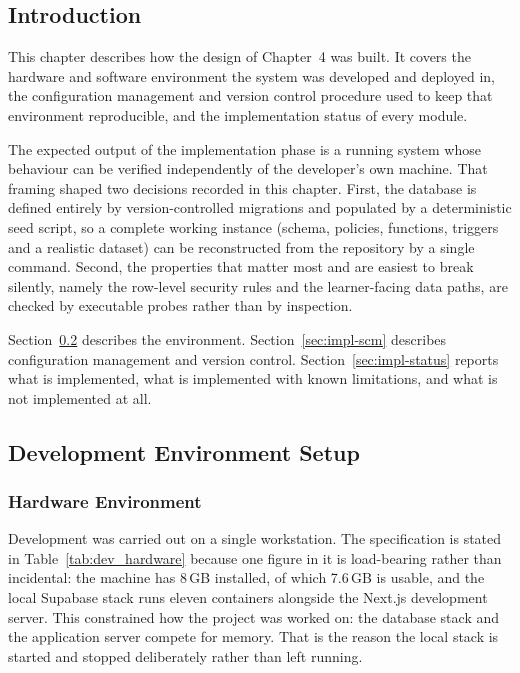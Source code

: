 \documentclass[12pt, oneside]{article} %
\begin{document}
\subsection{Introduction}

This chapter describes how the design of Chapter~4 was built. It covers the hardware and software environment the system was developed and deployed in, the configuration management and version control procedure used to keep that environment reproducible, and the implementation status of every module.

The expected output of the implementation phase is a running system whose behaviour can be verified independently of the developer's own machine. That framing shaped two decisions recorded in this chapter. First, the database is defined entirely by version-controlled migrations and populated by a deterministic seed script, so a complete working instance (schema, policies, functions, triggers and a realistic dataset) can be reconstructed from the repository by a single command. Second, the properties that matter most and are easiest to break silently, namely the row-level security rules and the learner-facing data paths, are checked by executable probes rather than by inspection.

Section~\ref{sec:impl-env} describes the environment. Section~\ref{sec:impl-scm} describes configuration management and version control. Section~\ref{sec:impl-status} reports what is implemented, what is implemented with known limitations, and what is not implemented at all.

\subsection{Development Environment Setup}
\label{sec:impl-env}

\subsubsection{Hardware Environment}

Development was carried out on a single workstation. The specification is stated in Table~\ref{tab:dev_hardware} because one figure in it is load-bearing rather than incidental: the machine has 8\,GB installed, of which 7.6\,GB is usable, and the local Supabase stack runs eleven containers alongside the Next.js development server. This constrained how the project was worked on: the database stack and the application server compete for memory. That is the reason the local stack is started and stopped deliberately rather than left running.
\end{document}

